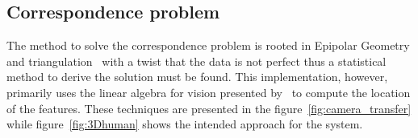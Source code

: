 


\subsection{Correspondence problem}
The method to solve the correspondence problem is rooted in  Epipolar Geometry and triangulation~\cite{siciliano2010robotics} with a twist that the data is not perfect thus a statistical method to derive the solution must be found.
This implementation, however, primarily uses the linear algebra for vision presented by~\cite{corke2017robotics} to compute the location of the features.
These techniques are presented in the figure~\ref{fig:camera_transfer} while figure~\ref{fig:3Dhuman} shows the intended approach for the system.

